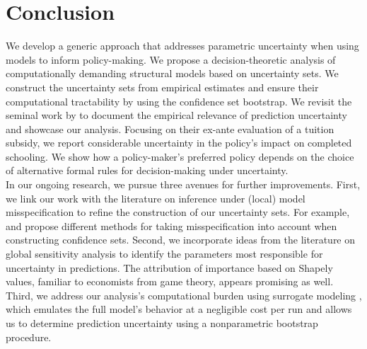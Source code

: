 \FloatBarrier\section{Conclusion}\label{Conclusion}
We develop a generic approach that addresses parametric uncertainty when using models to inform policy-making. We propose a decision-theoretic analysis of computationally demanding structural models based on uncertainty sets. We construct the uncertainty sets from empirical estimates and ensure their computational tractability by using the confidence set bootstrap. We revisit the seminal work by \citet{Keane.1997} to document the empirical relevance of prediction uncertainty and showcase our analysis. Focusing on their ex-ante evaluation of a tuition subsidy, we report considerable uncertainty in the policy's impact on completed schooling. We show how a policy-maker's preferred policy depends on the choice of alternative formal rules for decision-making under uncertainty.\\

\noindent In our ongoing research, we pursue three avenues for further improvements. First, we link our work with the literature on inference under (local) model misspecification to refine the construction of our uncertainty sets. For example, \citet{Armstrong.2021} and \citet{Bonhomme.2021} propose different methods for taking misspecification into account when constructing confidence sets. Second, we incorporate ideas from the literature on global sensitivity analysis \citep{Razavi.2021} to identify the parameters most responsible for uncertainty in predictions. The attribution of importance based on Shapely values, familiar to economists from game theory, appears promising \citep{Owen.2014, Shapley.1953} as well. Third, we address our analysis's computational burden using surrogate modeling \citep{Forrester.2008}, which emulates the full model's behavior at a negligible cost per run and allows us to determine prediction uncertainty using a nonparametric bootstrap procedure.
